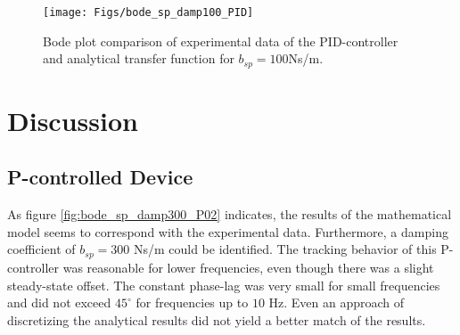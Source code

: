 \begin{figure}[h!]
	\centering
	\texttt{[image: Figs/bode\_sp\_damp100\_PID]}
	\caption{Bode plot comparison of experimental data of the PID-controller and analytical transfer function for $b_{sp} = 100$Ns/m.}
	\label{fig:bode_sp_damp100_PID}
\end{figure}



\section{Discussion}
\subsection{P-controlled Device}
As figure \ref{fig:bode_sp_damp300_P02} indicates, the results of the mathematical model seems to correspond with the experimental data. Furthermore, a damping coefficient of $b_{sp} = 300$ Ns/m could be identified. The tracking behavior of this P-controller was reasonable for lower frequencies, even though there was a slight steady-state offset. The constant phase-lag was very small for small frequencies and did not exceed $45^\circ$ for frequencies up to $10$ Hz. Even an approach of discretizing the analytical results did not yield a better match of the results. %
 
